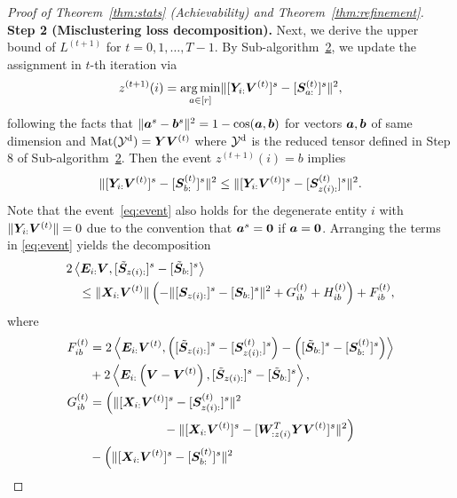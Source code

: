 \documentclass[journal]{IEEEtran}
\theoremstyle{definition}
\theoremstyle{definition}
\newcommand{\of}[1]{\left(#1\right)}
\newcommand{\ang}[1]{\left\langle#1\right\rangle}
\begin{document}
\begin{proof}[Proof of Theorem~\ref{thm:stats} (Achievability) and Theorem~\ref{thm:refinement}]
{}

{\bf Step 2 (Misclustering loss decomposition).} Next, we derive the upper bound of $L^{(t+1)}$ for $t = 0 ,1, \ldots, T-1$. By Sub-algorithm~\hyperref[alg:main]{2}, we update the assignment in $t$-th iteration via
    \begin{equation}
        z^{(t+1)}(i) = \operatorname*{arg\,min}_{a \in [r]} \lVert [ \bm Y_{i:} \bm{V}^{(t)}  ]^s - [\bm S_{a:}^{(t)}]^s \rVert^2,
    \end{equation}
    following the facts that $\lVert\bm{a}^s - \bm{b}^s\rVert^2 = 1 - \cos(\bm{a}, \bm{b})$ for vectors $\bm{a},\bm{b}$ of same dimension and $\text{Mat}(\mathcal{Y}^\text{d}) = \bm Y \bm{V}^{(t)}$ where $\mathcal{Y}^\text{d}$ is the reduced tensor defined in Step 8 of Sub-algorithm~\hyperref[alg:main]{2}. Then the event $z^{(t+1)}(i) = b$ implies
    \begin{equation}\label{eq:event}
        \onormSize{}{ [ \mY_{i:} \mV^{(t)}  ]^s - [\mS_{b:}^{(t)}]^s }^2 \leq \onormSize{}{ [ \mY_{i:} \mV^{(t)}  ]^s - [\mS_{z(i):}^{(t)}]^s }^2.
    \end{equation}
Note that the event~\eqref{eq:event} also holds for the degenerate entity $i$ with $\lVert\bm Y_{i:} \bm{V}^{(t)}\rVert = 0$ due to the convention that $\bm{a}^s = {\bf 0}$ if $\bm{a} = {\bf 0}$. 
    Arranging the terms in \eqref{eq:event} yields the decomposition
    \small
    \begin{align}
        &2 \ang{ \mE_{i:} \mV, [  \tilde \mS_{z(i):} ]^s - [  \tilde \mS_{b:} ]^s } \\
        & \quad \leq \onormSize{}{\mX_{i:} \mV^{(t)}} \of{ - \onormSize{}{ [ \mS_{z(i):}  ]^s - [ \mS_{b:}  ]^s  }^2 + G_{ib}^{(t)} + H_{ib}^{(t)} } +  F_{ib}^{(t)},\label{eq:decomp}
    \end{align}
    \normalsize
    where
    \small
    \begin{align}
        F_{ib}^{(t)} &= 2 \ang{\mE_{i:} \mV^{(t)}, \of{ [  \tilde \mS_{z(i):} ]^s  -  [  \mS_{z(i):}^{(t)} ]^s  }  - \of{  [  \tilde \mS_{b:} ]^s  -  [  \mS_{b:}^{(t)} ]^s  }  }  \\
        & + 2 \ang{ \mE_{i:} \of{ \mV - \mV^{(t)} }, [  \tilde \mS_{z(i):} ]^s - [  \tilde \mS_{b:} ]^s  }, \label{eq:f}\\
        G_{ib}^{(t)} &=   \Big( \onormSize{}{ [\mX_{i:} \mV^{(t)}]^s -  [  \mS_{z(i):}^{(t)}  ]^s}^2 \\
        & \quad \quad \quad \quad \quad \quad -  \onormSize{}{ [\mX_{i:} \mV^{(t)}]^s -  [  \mW_{:z(i)}^T \mY \mV^{(t)} ]^s}^2\Big)   \\
        & -   \Big( \onormSize{}{ [\mX_{i:} \mV^{(t)}]^s -  [  \mS_{b:}^{(t)}  ]^s}^2 \\

\end{align}
\end{proof}
\end{document}
